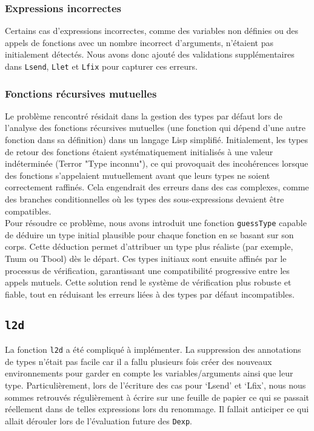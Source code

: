 \documentclass[a4paper,12pt]{article}
\begin{document}
    \subsubsection{Expressions incorrectes}
    Certains cas d’expressions incorrectes, comme des variables non définies ou des appels de fonctions avec un nombre incorrect d’arguments, n’étaient pas initialement détectés. Nous avons donc ajouté des validations supplémentaires dans \texttt{Lsend}, \texttt{Llet} et \texttt{Lfix} pour capturer ces erreurs.
    \subsubsection{Fonctions récursives mutuelles}
    Le problème rencontré résidait dans la gestion des types par défaut lors de l'analyse des fonctions récursives mutuelles (une fonction qui dépend d'une autre fonction dans sa définition) dans un langage Lisp simplifié. Initialement, les types de retour des fonctions étaient systématiquement initialisés à une valeur indéterminée (Terror "Type inconnu"), ce qui provoquait des incohérences lorsque des fonctions s'appelaient mutuellement avant que leurs types ne soient correctement raffinés. Cela engendrait des erreurs dans des cas complexes, comme des branches conditionnelles où les types des sous-expressions devaient être compatibles. \\

    Pour résoudre ce problème, nous avons introduit une fonction \texttt{guessType} capable de déduire un type initial plausible pour chaque fonction en se basant sur son corps. Cette déduction permet d’attribuer un type plus réaliste (par exemple, Tnum ou Tbool) dès le départ. Ces types initiaux sont ensuite affinés par le processus de vérification, garantissant une compatibilité progressive entre les appels mutuels. Cette solution rend le système de vérification plus robuste et fiable, tout en réduisant les erreurs liées à des types par défaut incompatibles.
    
    \subsection{\texttt{l2d}}
        La fonction \texttt{l2d} a été compliqué à implémenter. La suppression des annotations
        de types n'était pas facile car il a fallu plusieurs fois créer des nouveaux environnements
        pour garder en compte les variables/arguments ainsi que leur type. Particulièrement, lors
        de l'écriture des cas pour `Lsend' et `Lfix', nous nous sommes retrouvés régulièrement à
        écrire sur une feuille de papier ce qui se passait réellement dans de telles expressions
        lors du renommage. Il fallait anticiper ce qui allait dérouler lors de l'évaluation future
        des \texttt{Dexp}.
\end{document}
